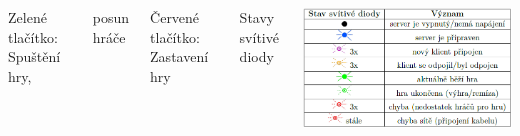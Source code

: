 \documentclass{beamer}
\begin{document}
\begin{frame}
\begin{columns}[c]
{ 		{\color{green} Zelené tlačítko:} Spuštění hry, 
 		
 		\hspace{2.5cm} posun hráče
 		
		{\color{red} Červené tlačítko:} Zastavení hry 	
		\begin{table}
			\centering
			\caption{Stavy svítivé diody}
			\includegraphics[width=\textwidth]{img/serverLED.png}
		\end{table}
	}
\end{columns}
\end{frame}
\end{document}
